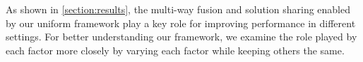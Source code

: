 As shown in \ref{section:results}, the multi-way fusion and solution sharing enabled by our uniform framework play a key role for improving performance in different settings. For better understanding our framework, we examine the role played by each factor more closely by varying each factor while keeping others the same.

